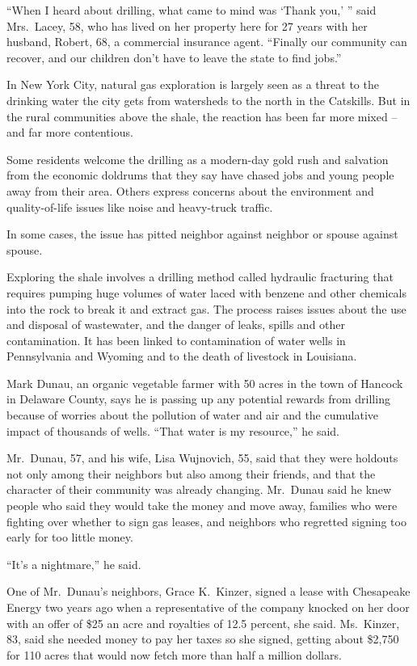 ﻿\documentclass[12pt]{article}
\begin{document}
``When I heard about drilling, what came to mind was `Thank you,' '' said Mrs.~Lacey, 58, who has
lived on her property here for 27 years with her husband, Robert, 68, a commercial insurance agent.
``Finally our community can recover, and our children don't have to leave the state to find jobs.''

In New York City, natural gas exploration is largely seen as a threat to the drinking water the city
gets from watersheds to the north in the Catskills. But in the rural communities above the shale,
the reaction has been far more mixed -- and far more contentious.

Some residents welcome the drilling as a modern-day gold rush and salvation from the economic
doldrums that they say have chased jobs and young people away from their area. Others express
concerns about the environment and quality-of-life issues like noise and heavy-truck traffic.

In some cases, the issue has pitted neighbor against neighbor or spouse against spouse.

Exploring the shale involves a drilling method called hydraulic fracturing that requires pumping
huge volumes of water laced with benzene and other chemicals into the rock to break it and extract
gas. The process raises issues about the use and disposal of wastewater, and the danger of leaks,
spills and other contamination. It has been linked to contamination of water wells in Pennsylvania
and Wyoming and to the death of livestock in Louisiana.

Mark Dunau, an organic vegetable farmer with 50 acres in the town of Hancock in Delaware County,
says he is passing up any potential rewards from drilling because of worries about the pollution of
water and air and the cumulative impact of thousands of wells. ``That water is my resource,'' he
said.

Mr.~Dunau, 57, and his wife, Lisa Wujnovich, 55, said that they were holdouts not only among their
neighbors but also among their friends, and that the character of their community was already
changing. Mr.~Dunau said he knew people who said they would take the money and move away, families
who were fighting over whether to sign gas leases, and neighbors who regretted signing too early for
too little money.

``It's a nightmare,'' he said.

One of Mr.~Dunau's neighbors, Grace K.~Kinzer, signed a lease with Chesapeake Energy two years ago
when a representative of the company knocked on her door with an offer of \$25 an acre and royalties
of 12.5 percent, she said. Ms.~Kinzer, 83, said she needed money to pay her taxes so she signed,
getting about \$2,750 for 110 acres that would now fetch more than half a million dollars.
\end{document}
